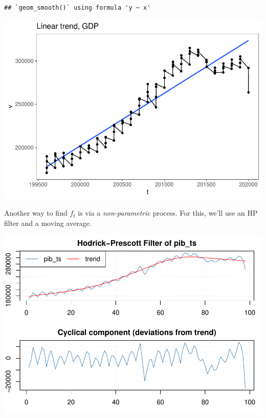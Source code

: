\documentclass[
]{article}
\newenvironment{Shaded}{\begin{snugshade}}{\end{snugshade}}
\newcommand{\DataTypeTok}[1]{\textcolor[rgb]{0.13,0.29,0.53}{#1}}
\newcommand{\DecValTok}[1]{\textcolor[rgb]{0.00,0.00,0.81}{#1}}
\newcommand{\KeywordTok}[1]{\textcolor[rgb]{0.13,0.29,0.53}{\textbf{#1}}}
\newcommand{\NormalTok}[1]{#1}
\newcommand{\OperatorTok}[1]{\textcolor[rgb]{0.81,0.36,0.00}{\textbf{#1}}}
\newcommand{\StringTok}[1]{\textcolor[rgb]{0.31,0.60,0.02}{#1}}
\begin{document}
\begin{verbatim}
## `geom_smooth()` using formula 'y ~ x'
\end{verbatim}

\begin{center}\includegraphics{Econo2_P5_files/figure-latex/parametric linear-1} \end{center}

Another way to find \(f_t\) is via a \emph{non-parametric} process. For
this, we'll use an HP filter and a moving average.

\begin{Shaded}
\end{Shaded}

\begin{center}\includegraphics{Econo2_P5_files/figure-latex/hp filter-1} \end{center}
\end{document}
